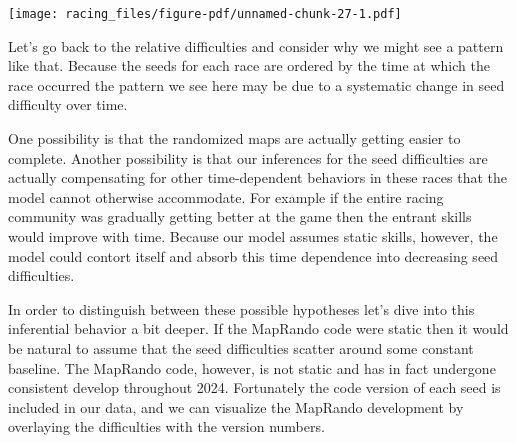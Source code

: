 \documentclass[
  letterpaper,
  DIV=11,
  numbers=noendperiod]{scrartcl}
\begin{document}
\texttt{[image: racing\_files/figure-pdf/unnamed-chunk-27-1.pdf]}

Let's go back to the relative difficulties and consider why we might see
a pattern like that. Because the seeds for each race are ordered by the
time at which the race occurred the pattern we see here may be due to a
systematic change in seed difficulty over time.

One possibility is that the randomized maps are actually getting easier
to complete. Another possibility is that our inferences for the seed
difficulties are actually compensating for other time-dependent
behaviors in these races that the model cannot otherwise accommodate.
For example if the entire racing community was gradually getting better
at the game then the entrant skills would improve with time. Because our
model assumes static skills, however, the model could contort itself and
absorb this time dependence into decreasing seed difficulties.

In order to distinguish between these possible hypotheses let's dive
into this inferential behavior a bit deeper. If the MapRando code were
static then it would be natural to assume that the seed difficulties
scatter around some constant baseline. The MapRando code, however, is
not static and has in fact undergone consistent develop throughout 2024.
Fortunately the code version of each seed is included in our data, and
we can visualize the MapRando development by overlaying the difficulties
with the version numbers.
\end{document}
